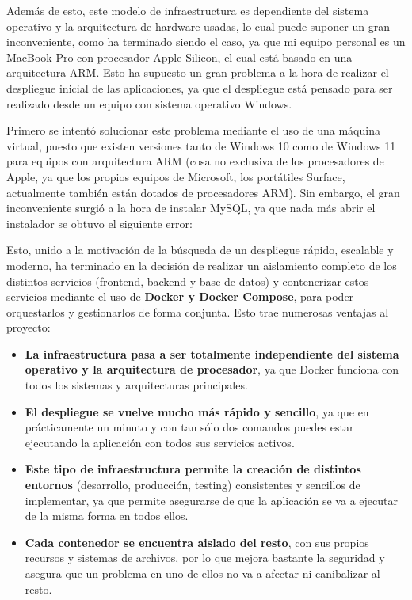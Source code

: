 Además de esto, este modelo de infraestructura es dependiente del sistema operativo y la arquitectura de hardware usadas, lo cual puede suponer un gran inconveniente, como ha terminado siendo el caso, ya que mi equipo personal es un MacBook Pro con procesador Apple Silicon, el cual está basado en una arquitectura ARM. Esto ha supuesto un gran problema a la hora de realizar el despliegue inicial de las aplicaciones, ya que el despliegue está pensado para ser realizado desde un equipo con sistema operativo Windows. 

Primero se intentó solucionar este problema mediante el uso de una máquina virtual, puesto que existen versiones tanto de Windows 10 como de Windows 11 para equipos con arquitectura ARM (cosa no exclusiva de los procesadores de Apple, ya que los propios equipos de Microsoft, los portátiles Surface, actualmente también están dotados de procesadores ARM). Sin embargo, el gran inconveniente surgió a la hora de instalar MySQL, ya que nada más abrir el instalador se obtuvo el siguiente error:


Esto, unido a la motivación de la búsqueda de un despliegue rápido, escalable y moderno, ha terminado en la decisión de realizar un aislamiento completo de los distintos servicios (frontend, backend y base de datos) y contenerizar estos servicios mediante el uso de \textbf{Docker y Docker Compose}, para poder orquestarlos y gestionarlos de forma conjunta. Esto trae numerosas ventajas al proyecto:

\begin{itemize}
  \item \textbf{La infraestructura pasa a ser totalmente independiente del sistema operativo y la arquitectura de procesador}, ya que Docker funciona con todos los sistemas y arquitecturas principales.
  \item \textbf{El despliegue se vuelve mucho más rápido y sencillo}, ya que en prácticamente un minuto y con tan sólo dos comandos puedes estar ejecutando la aplicación con todos sus servicios activos. 
  \item \textbf{Este tipo de infraestructura permite la creación de distintos entornos} (desarrollo, producción, testing) consistentes y sencillos de implementar, ya que permite asegurarse de que la aplicación se va a ejecutar de la misma forma en todos ellos.
  \item \textbf{Cada contenedor se encuentra aislado del resto}, con sus propios recursos y sistemas de archivos, por lo que mejora bastante la seguridad y asegura que un problema en uno de ellos no va a afectar ni canibalizar al resto.
\end{itemize}

